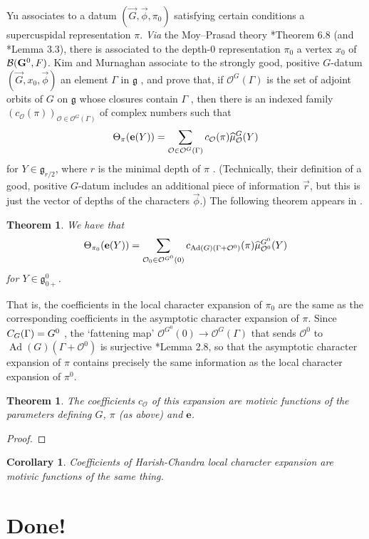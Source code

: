 \documentclass[12pt]{amsart}
\newcommand{\bG}{\mathbf{G}}
\newcommand{\cO}{{\mathcal O}}
\newcommand{\fg}{\mathfrak{g}}
\newcommand{\Ad}{\operatorname{Ad}}
\newcommand{\mexp}{\mathbf{e}}
\def\cO{\mathcal{O}}
\theoremstyle{plain}
\newtheorem{theorem}[thm]{Theorem}
\newtheorem{cor}[thm]{Corollary}
\theoremstyle{definition}
\begin{document}
Yu \cite{yu:supercuspidal} associates to a datum
\((\vec G, \vec\phi, \pi_0)\) satisfying certain conditions
a supercuspidal representation \(\pi\).
\textit{Via} the Moy--Prasad theory
\cite{moy-prasad:jacquet}*{Theorem 6.8}
(and \cite{yu:supercuspidal}*{Lemma 3.3}), there is
associated to the depth-0 representation \(\pi_0\) a vertex
\(x_0\) of \(\BB(\bG^0, \field)\).
Kim and Murnaghan 
associate to the strongly good, positive \(G\)-datum
\((\vec G, x_0, \vec\phi)\) 
an element \(\Gamma\) in \(\fg\) ,
and prove that, if \(\cO^G(\Gamma)\) is the set of adjoint
orbits of \(G\) on \(\fg\) whose closures contain \(\Gamma\)
, then there is an indexed family
\((c_\cO(\pi))_{\cO \in \cO^G(\Gamma)}\) of complex numbers
such that
\[
\Theta_\pi(\mexp(Y))
= \sum_{\cO \in \cO^G(\Gamma)}
	c_\cO(\pi)\muhat^G_\cO(Y)
\]
for \(Y \in \fg_{r/2}\), where \(r\) is the minimal depth of
\(\pi\)
.
(Technically, their definition of a good, positive
\(G\)-datum includes an additional piece of information
\(\vec r\), but this is just the vector of depths of the
characters \(\vec\phi\).)
The following theorem appears in \cite{spice:coefficients}.

\begin{theorem}
We have that
\[
\Theta_{\pi_0}(\mexp(Y))
= \sum_{\cO_0 \in \cO^{G^0}(0)}
	c_{\Ad(G)(\Gamma + \cO^0)}(\pi)\muhat^{G^0}_{\cO^0}(Y)
\]
for \(Y \in \fg^0_{0+}\).
\end{theorem}

That is, the coefficients in the local character expansion
of \(\pi_0\) are the same as the corresponding coefficients
in the asymptotic character expansion of \(\pi\).
Since
\(C_G(\Gamma) = G^0\) \citeme,
the `fattening map'
\(\cO^{G^0}(0) \to \cO^G(\Gamma)\)
that sends \(\cO^0\) to \(\Ad(G)(\Gamma + \cO^0)\) is
surjective \cite{hc:queens}*{Lemma 2.8},
so that the asymptotic character expansion of
\(\pi\) contains precisely the same information as the local
character expansion of \(\pi^0\).
 
\begin{theorem} The coefficients $c_{\cO}$ of this expansion are motivic functions of the parameters defining $G$, $\pi$ (as above) and $\mexp$. 
\end{theorem}

\begin{proof}
\end{proof}

\begin{cor}
Coefficients of Harish-Chandra local character expansion are motivic functions of the same thing.
\end{cor}

\section{Done!}

\begin{bibdiv}
\begin{biblist}
\end{biblist}
\end{bibdiv}
\end{document}
